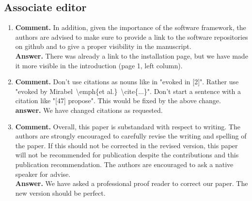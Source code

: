 \documentclass{article}
\begin{document}
\subsection*{Associate editor}
\begin{enumerate}
\item \textbf{Comment.} In addition, given the importance of the
  software framework, the authors are advised to make sure to provide
  a link to the software repositories on github and to give a proper
  visibility in the manuscript.\\ \textbf{Answer.} There was already a
  link to the installation page, but we have made it more visible in
  the introduction (page 1, left column).

\item \textbf{Comment.} Don't use citations as nouns like in "evoked
  in [2]". Rather use "evoked by Mirabel~\textbackslash emph\{et al.\}~\textbackslash cite\{...\}".
  Don't start a sentence with a citation like "[47] propose". This
  would be fixed by the above change.\\
  \textbf{answer.} We have changed citations as requested.

\item \textbf{Comment.}  Overall, this paper is substandard with
  respect to writing. The authors are strongly encouraged to carefully
  revise the writing and spelling of the paper. If this should not be
  corrected in the revised version, this paper will not be recommended
  for publication despite the contributions and this publication
  recommendation. The authors are encouraged to ask a native speaker
  for advise.\\ \textbf{Answer.} %
  We have asked a professional proof reader to correct our
  paper. The new version should be perfect.
\end{enumerate}
\end{document}
